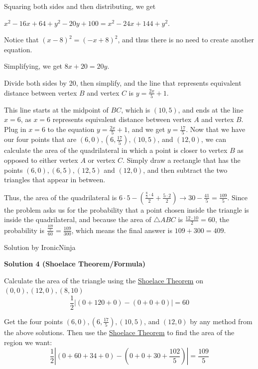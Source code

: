 \begin{enumerate}
 Squaring both sides and then distributing, we get 

 $x^2 - 16x + 64 + y^2 - 20y + 100 = x^2 - 24x + 144 + y^2$.

 Notice that $(x-8)^2 = (-x+8)^2$, and thus there is no need to create another equation.

 Simplifying, we get $8x + 20 = 20y$.

 Divide both sides by 20, then simplify, and the line that represents equivalent distance between vertex $B$ and vertex $C$ is $y = \frac{2x}{5} + 1$.

 This line starts at the midpoint of $BC$, which is $(10,5)$, and ends at the line $x=6$, as $x=6$ represents equivalent distance between vertex $A$ and vertex $B$. Plug in $x=6$ to the equation $y = \frac{2x}{5} + 1$, and we get $y = \frac{17}{5}$. Now that we have our four points that are $(6,0), (6,\frac{17}{5}), (10,5)$, and $(12,0)$, we can calculate the area of the quadrilateral in which a point is closer to vertex $B$ as opposed to either vertex $A$ or vertex $C$. Simply draw a rectangle that has the points $(6,0), (6,5), (12,5)$ and $(12,0)$, and then subtract the two triangles that appear in between. 

 Thus, the area of the quadrilateral is $6\cdot5 - (\frac{\frac{8}{5}\cdot4}{2} + \frac{5\cdot2}{2}) \rightarrow 30 - \frac{41}{5} = \frac{109}{5}$. Since the problem asks us for the probability that a point chosen inside the triangle is inside the quadrilateral, and because the area of $\triangle ABC$ is $\frac{12\cdot10}{2} = 60$, the probability is $\frac{\frac{109}{5}}{60}=\frac{109}{300}$, which means the final answer is $109+300=\boxed{409}$.

 Solution by IronicNinja~

 



\textbf{Solution 4 (Shoelace Theorem/Formula)}

Calculate the area of the triangle using the \href{https://artofproblemsolving.com/wiki/index.php?title=Shoelace\_Theorem}{Shoelace Theorem} on $(0,0), (12,0), (8,10)$
 \[\frac{1}{2}|(0+120+0)-(0+0+0)|=60\]

 Get the four points $(6,0), (6,\frac{17}{5}), (10,5)$, and $(12,0)$ by any method from the above solutions. Then use the \href{https://artofproblemsolving.com/wiki/index.php?title=Shoelace\_Theorem}{Shoelace Theorem} to find the area of the region we want:
 \[\frac{1}{2}|(0+60+34+0)-(0+0+30+\frac{102}{5})|=\frac{109}{5}\]


\end{enumerate}
